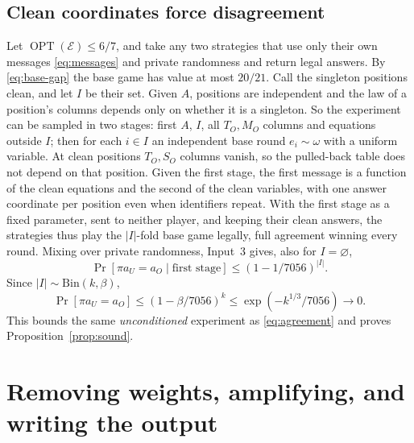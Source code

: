 \documentclass[11pt]{article}
\newcommand{\OPT}{\operatorname{OPT}}
\begin{document}
\subsection{Clean coordinates force disagreement}\label{sec:clean}

Let $\OPT(\mathcal E)\le6/7$, and take any two strategies that use only their
own messages \eqref{eq:messages} and private randomness and return legal
answers. By \eqref{eq:base-gap} the base game has value at most $20/21$. Call the
singleton positions clean, and let $I$ be their set. Given $A$, positions
are independent and the law of a position's columns depends only on whether
it is a singleton. So the experiment can be sampled in two stages: first
$A$, $I$, all $T_O,M_O$ columns and equations outside $I$; then for each
$i\in I$ an independent base round $e_i\sim\omega$ with a uniform variable.
At clean positions $T_O,S_O$ columns vanish, so the pulled-back table does
not depend on that position. Given the first stage, the first message is a
function of the clean equations and the second of the clean variables, with
one answer coordinate per position even when identifiers repeat. With the first
stage as a fixed parameter, sent to neither player, and keeping their clean
answers, the strategies thus play
the $|I|$-fold base game legally, full agreement winning every round.
Mixing over private randomness, Input~3 gives, also for $I=\varnothing$,
\[
 \Pr[\pi a_U=a_O\mid\text{first stage}]\le(1-1/7056)^{|I|}.
\]
Since $|I|\sim\mathrm{Bin}(k,\beta)$,
\begin{equation}\label{eq:clean-upper}
 \Pr[\pi a_U=a_O]\le(1-\beta/7056)^k\le\exp(-k^{1/3}/7056)\longrightarrow0.
\end{equation}
This bounds the same \emph{unconditioned} experiment as
\eqref{eq:agreement} and proves Proposition~\ref{prop:sound}.

\section{Removing weights, amplifying, and writing the output}\label{sec:finish}
\end{document}
